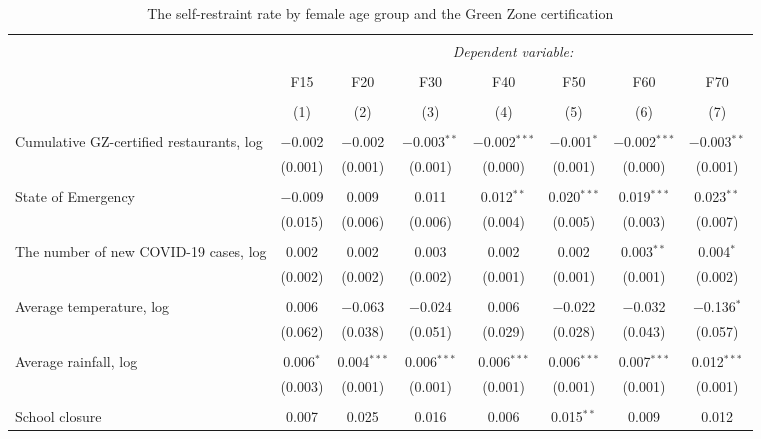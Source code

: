 
\begin{table}[!htbp] \centering 
  \caption{The self-restraint rate by female age group and the Green Zone certification} 
  \label{} 
\footnotesize 
\begin{tabular}{@{\extracolsep{-11pt}}lccccccc} 
\\[-1.8ex]\hline 
\hline \\[-1.8ex] 
 & \multicolumn{7}{c}{\textit{Dependent variable:}} \\ 
\cline{2-8} 
\\[-1.8ex] & F15 & F20 & F30 & F40 & F50 & F60 & F70 \\ 
\\[-1.8ex] & (1) & (2) & (3) & (4) & (5) & (6) & (7)\\ 
\hline \\[-1.8ex] 
 Cumulative GZ-certified restaurants, log & $-$0.002 & $-$0.002 & $-$0.003$^{**}$ & $-$0.002$^{***}$ & $-$0.001$^{*}$ & $-$0.002$^{***}$ & $-$0.003$^{**}$ \\ 
  & (0.001) & (0.001) & (0.001) & (0.000) & (0.001) & (0.000) & (0.001) \\ 
  & & & & & & & \\ 
 State of Emergency & $-$0.009 & 0.009 & 0.011 & 0.012$^{**}$ & 0.020$^{***}$ & 0.019$^{***}$ & 0.023$^{**}$ \\ 
  & (0.015) & (0.006) & (0.006) & (0.004) & (0.005) & (0.003) & (0.007) \\ 
  & & & & & & & \\ 
 The number of new COVID-19 cases, log & 0.002 & 0.002 & 0.003 & 0.002 & 0.002 & 0.003$^{**}$ & 0.004$^{*}$ \\ 
  & (0.002) & (0.002) & (0.002) & (0.001) & (0.001) & (0.001) & (0.002) \\ 
  & & & & & & & \\ 
 Average temperature, log & 0.006 & $-$0.063 & $-$0.024 & 0.006 & $-$0.022 & $-$0.032 & $-$0.136$^{*}$ \\ 
  & (0.062) & (0.038) & (0.051) & (0.029) & (0.028) & (0.043) & (0.057) \\ 
  & & & & & & & \\ 
 Average rainfall, log & 0.006$^{*}$ & 0.004$^{***}$ & 0.006$^{***}$ & 0.006$^{***}$ & 0.006$^{***}$ & 0.007$^{***}$ & 0.012$^{***}$ \\ 
  & (0.003) & (0.001) & (0.001) & (0.001) & (0.001) & (0.001) & (0.001) \\ 
  & & & & & & & \\ 
 School closure & 0.007 & 0.025 & 0.016 & 0.006 & 0.015$^{**}$ & 0.009 & 0.012 \\ 

\end{tabular}
\end{table}
